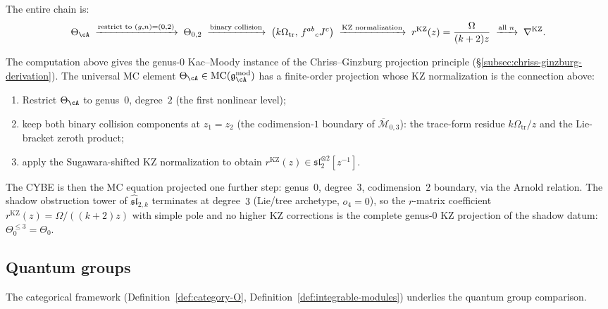 \begin{computation}
The entire chain is:
\[
\Theta_\cA
\;\xrightarrow{\text{restrict to }(g,n) = (0,2)}
\;\Theta_{0,2}
\;\xrightarrow{\text{binary collision}}\;
\bigl(k\Omega_{\mathrm{tr}},\, f^{ab}{}_cJ^c\bigr)
\;\xrightarrow{\text{KZ normalization}}\;
r^{\mathrm{KZ}}(z) = \frac{\Omega}{(k+2)z}
\;\xrightarrow{\text{all }n}\;
\nabla^{\mathrm{KZ}}.
\]
\end{computation}

\begin{remark}
\label{rem:sl2-collision-chriss-ginzburg}
The computation above gives the genus-$0$ Kac--Moody instance of the
Chriss--Ginzburg projection principle
(\S\ref{subsec:chriss-ginzburg-derivation}).  The universal MC element
$\Theta_\cA \in \mathrm{MC}(\mathfrak{g}^{\mathrm{mod}}_\cA)$
has a finite-order projection whose KZ normalization is the
connection above:
\begin{enumerate}[label=\textup{(\roman*)}]
\item Restrict $\Theta_\cA$ to genus~$0$, degree~$2$
 (the first nonlinear level);
\item keep both binary collision components at $z_1 = z_2$
 (the codimension-$1$ boundary of
 $\overline{\mathcal{M}}_{0,3}$): the trace-form residue
 $k\Omega_{\mathrm{tr}}/z$ and the Lie-bracket zeroth product;
\item apply the Sugawara-shifted KZ normalization to obtain
 $r^{\mathrm{KZ}}(z) \in \mathfrak{sl}_2^{\otimes 2}[z^{-1}]$.
\end{enumerate}
The CYBE is then the MC equation projected one further step:
genus~$0$, degree~$3$, codimension~$2$ boundary, via the Arnold
relation. The shadow obstruction tower of $\widehat{\mathfrak{sl}}_{2,k}$
terminates at degree~$3$ (Lie/tree archetype, $o_4 = 0$), so the
$r$-matrix coefficient
$r^{\mathrm{KZ}}(z) = \Omega/((k+2)z)$ with simple pole and no
higher KZ corrections is the complete genus-$0$ KZ projection of the
shadow datum:
$\Theta^{\leq 3}_{0} = \Theta_{0}$.
\end{remark}

\subsection{Quantum groups}
\label{sec:km-quantum-groups}

The categorical framework
(Definition~\ref{def:category-O},
Definition~\ref{def:integrable-modules})
underlies the quantum group comparison.

